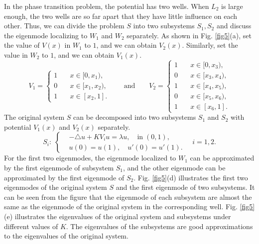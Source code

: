 \documentclass[a4paper,11pt]{article}
\begin{document}
In the phase transition problem, the potential has two wells. When $L_2$ is large enough, the two wells are so far apart that they have little influence on each other. Thus, we can divide the problem $S$ into two subsystems $S_1, S_2$ and discuss the eigenmode localizing to $W_1$ and $W_2$ separately. As shown in Fig. \ref{fig5}(a), set the value of $V(x)$ in $W_1$ to $1$, and we can obtain $V_2(x)$. Similarly, set the value in $W_2$ to $1$, and we can obtain $V_1(x)$.
\begin{equation*}
V_1 = \left\{
\begin{split}
1 & \quad x \in [0, x_1), \\
0 & \quad x \in [x_1, x_2), \\
1 & \quad x \in [x_2, 1].
\end{split}
\right.
\qquad
\text{and}
\qquad
V_2 = \left\{
\begin{split}
1 & \quad x \in [0, x_3), \\
0 & \quad x \in [x_3, x_4), \\
1 & \quad x \in [x_4, x_5), \\
0 & \quad x \in [x_5, x_6), \\
1 & \quad x \in [x_6, 1].
\end{split}
\right.
\end{equation*}
The original system $S$ can be decomposed into two subsystems $S_1$ and $S_2$ with potential $V_1(x)$ and $V_2(x)$ separately.
\begin{equation}
S_i: \;
\left\{
\begin{split}
& -\triangle u + K V_i u = \lambda u, \quad \textrm{in} \; (0, 1), \\
& u(0) = u(1), \quad u'(0) =  u'(1).
\end{split}
\right.
\quad
i = 1, 2.
\end{equation}
For the first two eigenmodes, the eigenmode localized to $W_1$ can be approximated by the first eigenmode of subsystem $S_1$, and the other eigenmode can be approximated by the first eigenmode of $S_2$.  Fig. \ref{fig5}(d) illustrates the first two eigenmodes of the original system $S$ and the first eigenmode of two subsystems. It can be seen from the figure that the eigenmode of each subsystem are almost the same as the eigenmode of the original system in the corresponding well. Fig. \ref{fig5}(e) illustrates the eigenvalues of the original system and subsystems under different values of $K$. The eigenvalues of the subsystems are good approximations to the eigenvalues of the original system.
\end{document}
